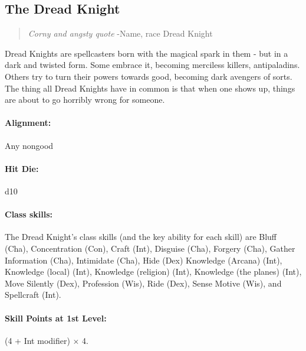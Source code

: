 \subsection[Dread Knight]{The Dread Knight}
\begin{quote}
\emph{Corny and angsty quote}
-Name, race Dread Knight
\end{quote}

Dread Knights are spellcasters born with the magical spark in them - but in a dark and twisted form.
Some embrace it, becoming merciless killers, antipaladins.
Others try to turn their powers towards good, becoming dark avengers of sorts.
The thing all Dread Knights have in common is that when one shows up, things are about to go horribly wrong for someone.
\paragraph{Alignment:} Any nongood
\paragraph{Hit Die:} d10
\paragraph{Class skills:}
The Dread Knight's class skills (and the key ability for each skill) are
Bluff (Cha), Concentration (Con), Craft (Int), Disguise (Cha), Forgery (Cha), Gather Information (Cha),
Intimidate (Cha), Hide (Dex) Knowledge (Arcana) (Int), Knowledge (local) (Int),
Knowledge (religion) (Int), Knowledge (the planes) (Int), Move Silently (Dex),
Profession (Wis), Ride (Dex), Sense Motive (Wis), and Spellcraft (Int).

\paragraph{Skill Points at 1st Level:} (4 + Int modifier) $\times$ 4.
